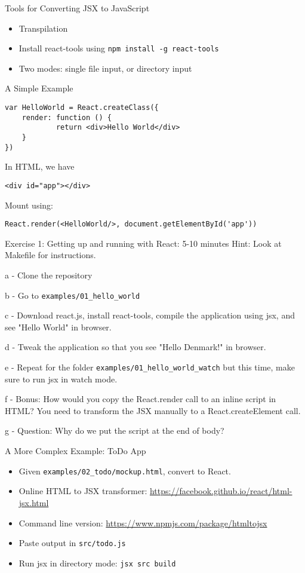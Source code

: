 \documentclass[presentation]{beamer}
\begin{document}
\begin{frame}[fragile,label=sec-15]{Tools for Converting JSX to JavaScript}
 \begin{itemize}
\item Transpilation
\item Install \alert{react-tools} using \texttt{npm install -g react-tools}
\item Two modes: single file input, or directory input
\end{itemize}
\end{frame}

\begin{frame}[fragile,label=sec-16]{A Simple Example}
 \begin{verbatim}
var HelloWorld = React.createClass({
    render: function () {
            return <div>Hello World</div>
    }
})
\end{verbatim}

In HTML, we have
\begin{verbatim}
<div id="app"></div>
\end{verbatim}
Mount using:
\begin{verbatim}
React.render(<HelloWorld/>, document.getElementById('app'))
\end{verbatim}
\end{frame}

\begin{frame}[fragile,label=sec-17]{Exercise 1: Getting up and running with React: 5-10 minutes}
 Hint: Look at Makefile for instructions.

a - Clone the repository

b - Go to \texttt{examples/01\_hello\_world}

c - Download react.js, install react-tools, compile the application using jsx, and see "Hello World" in browser.

d - Tweak the application so that you see "Hello Denmark!" in browser.

e - Repeat for the folder \texttt{examples/01\_hello\_world\_watch} but this time, make sure to run jsx in watch mode.

f - Bonus: How would you copy the React.render call to an inline script in HTML? You need to transform the JSX manually to a React.createElement call.

g - Question: Why do we put the script at the end of body?
\end{frame}

\begin{frame}[fragile,label=sec-18]{A More Complex Example: ToDo App}
 \begin{itemize}
\item Given \texttt{examples/02\_todo/mockup.html}, convert to React.
\item Online HTML to JSX transformer:
\url{https://facebook.github.io/react/html-jsx.html}
\item Command line version: \url{https://www.npmjs.com/package/htmltojsx}
\item Paste output in \texttt{src/todo.js}
\item Run jsx in directory mode: \texttt{jsx src build}
\end{itemize}
\end{frame}
\end{document}

